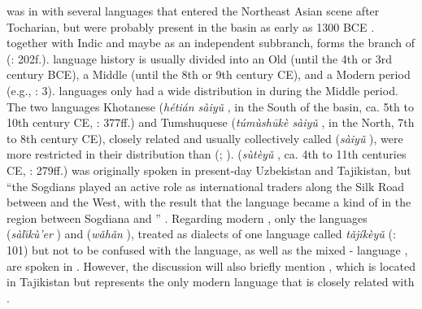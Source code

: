  was in  with several  languages that entered the Northeast Asian scene after Tocharian, but were probably present in the  basin as early as 1300 BCE \citep[50]{Mallory2010}.  together with Indic and maybe  as an independent subbranch, forms the  branch of  (\citealt{Fortson2010}: 202f.).  language history is usually divided into an Old  (until the 4th or 3rd century BCE), a Middle  (until the 8th or 9th century CE), and a Modern  period (e.g., \citealt{Schmitt2000}: 3).  languages only had a wide distribution in  during the Middle  period. The two languages Khotanese (\textit{hétián sàiyǔ} , in the South of the  basin, ca. 5th to 10th century CE, \citealt{Emmerick2009}: 377ff.) and Tumshuquese (\textit{túmùshūkè sàiyǔ} , in the North, 7th to 8th century CE), closely related and usually collectively called  (\textit{sàiyǔ} ), were more restricted in their distribution than  (\citealt{Emmerick2009}; \citealt{GengShimin2011}).  (\textit{sùtèyǔ} , ca. 4th to 11th centuries CE, \citealt{Yoshida2009}: 279ff.) was originally spoken in present-day Uzbekistan and Tajikistan, but “the Sogdians played an active role as international traders along the Silk Road between  and the West, with the result that the  language became a kind of  in the region between Sogdiana and ” \citep[279]{Yoshida2009}. Regarding modern , only the  languages  (\textit{sà}\textit{l\u{\i}kù’er} ) and  (\textit{wǎ}\textit{hǎn} ), treated as dialects of one language called \textit{tǎjíkèyǔ}  (\citealt{GaoErqiang1985}: 101) but not to be confused with the  language, as well as the mixed - language , are spoken in . However, the discussion will also briefly mention , which is located in Tajikistan but represents the only modern language that is closely related with .

